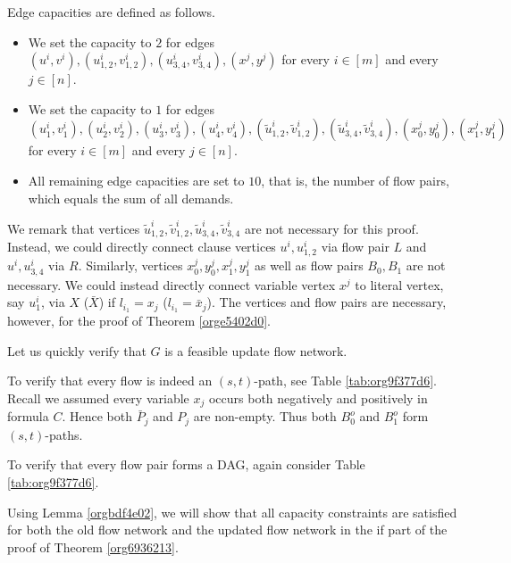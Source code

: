 \documentclass[fontsize=11pt,paper=a4]{book}
\begin{document}
Edge capacities are defined as follows.

\begin{itemize}
\item We set the capacity to \(2\) for edges \((u^i,v^i),(u_{1,2}^i,v_{1,2}^i),(u_{3,4}^i,v_{3,4}^i),(x^j,y^j)\) for every \(i\in[m]\) and every \(j\in[n]\).
\item We set the capacity to \(1\) for edges \((u_1^i,v_1^i),(u_2^i,v_2^i),(u_3^i,v_3^i),(u_4^i,v_4^i),(\tilde{u}_{1,2}^i,\tilde{v}_{1,2}^i),(\tilde{u}_{3,4}^i,\tilde{v}_{3,4}^i),(x_0^j,y_0^j),(x_1^j,y_1^j)\) for every \(i\in[m]\) and every \(j\in[n]\).
\item All remaining edge capacities are set to \(10\), that is, the number of flow pairs, which equals the sum of all demands.
\end{itemize}

We remark that vertices \(\tilde{u}_{1,2}^i,\tilde{v}_{1,2}^i,\tilde{u}_{3,4}^i,\tilde{v}_{3,4}^i\) are not necessary for this proof.
Instead, we could directly connect clause vertices \(u^i,u_{1,2}^i\) via flow pair \(L\) and \(u^i,u_{3,4}^i\) via \(R\).
Similarly, vertices \(x_0^j,y_0^j,x_1^j,y_1^j\) as well as flow pairs \(B_0,B_1\) are not necessary.
We could instead directly connect variable vertex \(x^j\) to literal vertex, say \(u_1^i\), via \(X\) (\(\bar{X}\)) if \(l_{i_1}=x_j\) (\(l_{i_1}=\bar{x}_j\)).
The vertices and flow pairs are necessary, however, for the proof of Theorem \ref{orge5402d0}.

Let us quickly verify that \(G\) is a feasible update flow network.

To verify that every flow is indeed an \((s,t)\)-path, see Table \ref{tab:org9f377d6}.
Recall we assumed every variable \(x_j\) occurs both negatively and positively in formula \(C\).
Hence both \(\bar{P}_j\) and \(P_j\) are non-empty.
Thus both \(B_0^o\) and \(B_1^o\) form \((s,t)\)-paths.

To verify that every flow pair forms a DAG, again consider Table \ref{tab:org9f377d6}.

Using Lemma \ref{orgbdf4e02}, we will show that all capacity constraints are satisfied for both the old flow network and the updated flow network in the if part of the proof of Theorem \ref{org6936213}.
\end{document}
